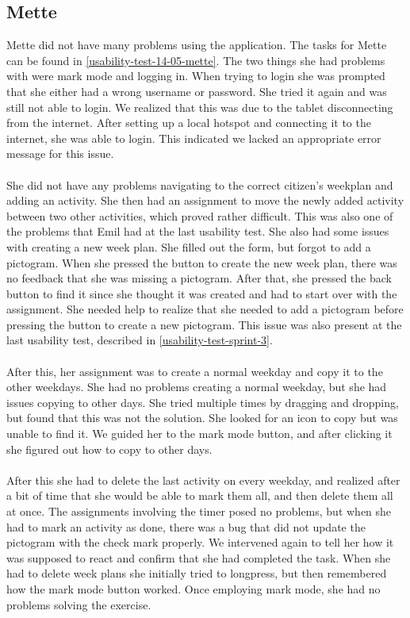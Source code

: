 \subsection{Mette}
Mette did not have many problems using the application.
The tasks for Mette can be found in \autoref{usability-test-14-05-mette}.
The two things she had problems with were mark mode and logging in.
When trying to login she was prompted that she either had a wrong username or password. 
She tried it again and was still not able to login.
We realized that this was due to the tablet disconnecting from the internet.
After setting up a local hotspot and connecting it to the internet, she was able to login.
This indicated we lacked an appropriate error message for this issue.
\\\\
She did not have any problems navigating to the correct citizen's weekplan and adding an activity.
She then had an assignment to move the newly added activity between two other activities, which proved rather difficult. 
This was also one of the problems that Emil had at the last usability test.
She also had some issues with creating a new week plan.
She filled out the form, but forgot to add a pictogram. 
When she pressed the button to create the new week plan, there was no feedback that she was missing a pictogram.
After that, she pressed the back button to find it since she thought it was created and had to start over with the assignment. 
She needed help to realize that she needed to add a pictogram before pressing the button to create a new pictogram.
This issue was also present at the last usability test, described in \autoref{usability-test-sprint-3}.
\\\\
After this, her assignment was to create a normal weekday and copy it to the other weekdays.
She had no problems creating a normal weekday, but she had issues copying to other days.
She tried multiple times by dragging and dropping, but found that this was not the solution. She looked for an icon to copy but was unable to find it. 
We guided her to the mark mode button, and after clicking it she figured out how to copy to other days.
\\\\
After this she had to delete the last activity on every weekday, and realized after a bit of time that she would be able to mark them all, and then delete them all at once.
The assignments involving the timer posed no problems, but when she had to mark an activity as done, there was a bug that did not update the pictogram with the check mark properly. 
We intervened again to tell her how it was supposed to react and confirm that she had completed the task.
When she had to delete week plans she initially tried to longpress, but then remembered how the mark mode button worked. 
Once employing mark mode, she had no problems solving the exercise.

